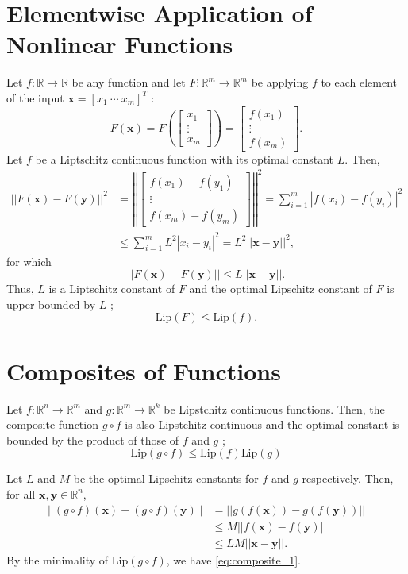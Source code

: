 \documentclass[12pt]{report}
\numberwithin{figure}{chapter}
\theoremstyle{plain}
\theoremstyle{definition}
\theoremstyle{corollary}
\theoremstyle{definition}
\theoremstyle{plain}
\theoremstyle{definition}
\theoremstyle{plain}
\newcommand\bx{\ensuremath{\boldsymbol x}}
\newcommand\by{\ensuremath{\boldsymbol y}}
\newcommand\lip{\ensuremath{\text{Lip}}}
\begin{document}
\section{Elementwise Application of Nonlinear Functions}
Let \(f:\mathbb R\to\mathbb R\) be any function and let \(F:\mathbb R^m\to\mathbb R^m\) be applying \(f\) to each element of the input \(\bx = [x_1\:\cdots\:x_m]^T\) :
\begin{equation}\label{eq:elementwise}
F(\bx)=F\left(\begin{bmatrix}x_1\\\vdots\\x_m\end{bmatrix}\right)=
\begin{bmatrix}f(x_1)\\\vdots\\f(x_m)\end{bmatrix}.
\end{equation}
Let \(f\) be a Liptschitz continuous function with its optimal constant \(L\).
Then,
\begin{align*}
||F(\bx)-F(\by)||^2
&=\left|\left|\begin{bmatrix}f(x_1)-f(y_1)\\\vdots\\f(x_m)-f(y_m)\end{bmatrix}\right|\right|^2
=\sum_{i=1}^m|f(x_i)-f(y_i)|^2\\
&\le\sum_{i=1}^mL^2|x_i-y_i|^2=L^2||\bx-\by||^2,
\end{align*}
for which
\[||F(\bx)-F(\by)||\le L||\bx-\by||.\]
Thus, \(L\) is a Liptschitz constant of \(F\) and the optimal Lipschitz constant of \(F\) is upper bounded by \(L\) ;
\begin{equation}\label{eq:elementwise_OLC}
\lip(F)\le\lip(f).
\end{equation}

\section{Composites of Functions}
Let \(f:\mathbb R^n\to\mathbb R^m\) and \(g:\mathbb R^m\to\mathbb R^k\) be Lipstchitz continuous functions.
Then, the composite function \(g\circ f\) is also Lipstchitz continuous and the optimal constant is bounded by the product of those of \(f\) and \(g\) ; 
\begin{equation}\label{eq:composite_1}
\lip(g\circ f)\le\lip(f)\lip(g)
\end{equation}

Let \(L\) and \(M\) be the optimal Lipschitz constants for \(f\) and \(g\) respectively.
Then, for all \(\bx,\by\in\mathbb R^n\),
\begin{align*}
||(g\circ f)(\bx)-(g\circ f)(\by)||
&=||g(f(\bx))-g(f(\by))||\\
&\le M||f(\bx)-f(\by)||\\
&\le LM||\bx-\by||.
\end{align*}
By the minimality of \(\lip(g\circ f)\), we have \eqref{eq:composite_1}.
\end{document}
